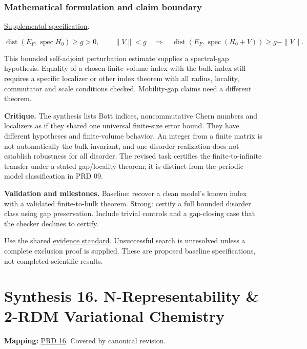 \documentclass[
  11pt,
]{article}
\begin{document}
\subsubsection{Mathematical formulation and claim boundary}

\href{https://github.com/rick-stevens-ai/Pure-Thought/blob/main/supplemental/S04.md}{Supplemental
specification}.

\[\operatorname{dist}(E_F,\operatorname{spec}H_0)\ge g>0,
\qquad\|V\|<g\quad\Longrightarrow\quad
\operatorname{dist}(E_F,\operatorname{spec}(H_0+V))\ge g-\|V\|.\]

This bounded self-adjoint perturbation estimate supplies a spectral-gap
hypothesis. Equality of a chosen finite-volume index with the bulk index
still requires a specific localizer or other index theorem with all
radius, locality, commutator and scale conditions checked. Mobility-gap
claims need a different theorem.

\textbf{Critique.} The synthesis lists Bott indices, noncommutative
Chern numbers and localizers as if they shared one universal finite-size
error bound. They have different hypotheses and finite-volume behavior.
An integer from a finite matrix is not automatically the bulk invariant,
and one disorder realization does not establish robustness for all
disorder. The revised task certifies the finite-to-infinite transfer
under a stated gap/locality theorem; it is distinct from the periodic
model classification in PRD 09.

\textbf{Validation and milestones.} Baseline: recover a clean model's
known index with a validated finite-to-bulk theorem. Strong: certify a
full bounded disorder class using gap preservation. Include trivial
controls and a gap-closing case that the checker declines to certify.

Use the shared
\href{https://github.com/rick-stevens-ai/Pure-Thought/blob/main/reviews/EVIDENCE-STANDARD.md}{evidence
standard}. Unsuccessful search is unresolved unless a complete exclusion
proof is supplied. These are proposed baseline specifications, not
completed scientific results.

\section{Synthesis 16. N-Representability \& 2-RDM Variational
Chemistry}

\textbf{Mapping:}
\href{https://github.com/rick-stevens-ai/Pure-Thought/blob/main/PRDs/16-N-Representability-2RDM.md}{PRD
16}. Covered by canonical revision.
\end{document}
